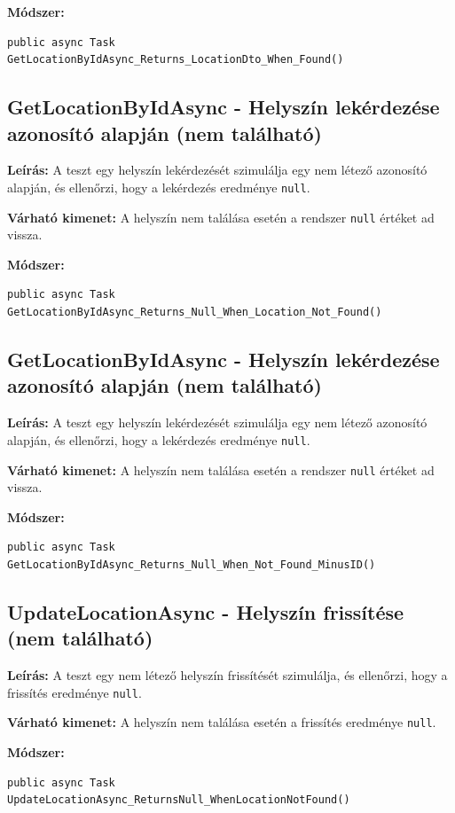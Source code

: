 \documentclass{report}[11pt]
\begin{document}
\textbf{Módszer:} 
\begin{lstlisting}
public async Task GetLocationByIdAsync_Returns_LocationDto_When_Found()
\end{lstlisting}

\subsection{GetLocationByIdAsync - Helyszín lekérdezése azonosító alapján (nem található)}
\textbf{Leírás:} A teszt egy helyszín lekérdezését szimulálja egy nem létező azonosító alapján, és ellenőrzi, hogy a lekérdezés eredménye \texttt{null}.

\textbf{Várható kimenet:} A helyszín nem találása esetén a rendszer \texttt{null} értéket ad vissza.

\textbf{Módszer:} 
\begin{lstlisting}
public async Task GetLocationByIdAsync_Returns_Null_When_Location_Not_Found()
\end{lstlisting}

\subsection{GetLocationByIdAsync - Helyszín lekérdezése azonosító alapján (nem található)}
\textbf{Leírás:} A teszt egy helyszín lekérdezését szimulálja egy nem létező azonosító alapján, és ellenőrzi, hogy a lekérdezés eredménye \texttt{null}.

\textbf{Várható kimenet:} A helyszín nem találása esetén a rendszer \texttt{null} értéket ad vissza.

\textbf{Módszer:} 
\begin{lstlisting}
public async Task GetLocationByIdAsync_Returns_Null_When_Not_Found_MinusID()
\end{lstlisting}

\subsection{UpdateLocationAsync - Helyszín frissítése (nem található)}
\textbf{Leírás:} A teszt egy nem létező helyszín frissítését szimulálja, és ellenőrzi, hogy a frissítés eredménye \texttt{null}.

\textbf{Várható kimenet:} A helyszín nem találása esetén a frissítés eredménye \texttt{null}.

\textbf{Módszer:} 
\begin{lstlisting}
public async Task UpdateLocationAsync_ReturnsNull_WhenLocationNotFound()
\end{lstlisting}
\end{document}
